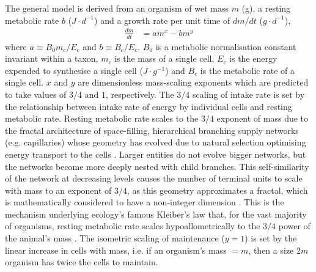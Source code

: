 \documentclass[a4paper]{article} %
\begin{document}
The \cite{West2001} general model is derived from an organism of wet mass $m$ (g), a resting metabolic rate $b$ ($J \cdot d^{-1}$) and a growth rate per unit time of $dm/dt$ ($g \cdot d^{-1}$),
\begin{align}
    \frac{dm}{dt} &= am^x - bm^y \label{west_ogm}
\end{align}
where $a \equiv B_{0}m_{c}/E_{c}$ and $b \equiv B_{c}/E_{c}$. $B_0$ is a metabolic normalisation constant invariant within a taxon, $m_{c}$ is the mass of a single cell, $E_{c}$ is the energy expended to synthesise a single cell ($J \cdot g^{-1}$) and $B_{c}$ is the metabolic rate of a single cell. $x$ and $y$ are dimensionless mass-scaling exponents which are predicted to take values of $3/4$ and $1$, respectively. The $3/4$ scaling of intake rate is set by the relationship between intake rate of energy by individual cells and resting metabolic rate. Resting metabolic rate scales to the $3/4$ exponent of mass due to the fractal architecture of space-filling, hierarchical branching supply networks (e.g. capillaries) whose geometry has evolved due to natural selection optimising energy transport to the cells \autocite{West1997, West2005}. Larger entities do not evolve bigger networks, but the networks become more deeply nested with child branches. This self-similarity of the network at decreasing levels causes the number of terminal units to scale with mass to an exponent of $3/4$, as this geometry approximates a fractal, which is mathematically considered to have a non-integer dimension \autocite{Hausdorff1918, Mandelbrot1982}. This is the mechanism underlying ecology's famous Kleiber's law that, for the vast majority of organisms, resting metabolic rate scales hypoallometrically to the $3/4$ power of the animal's mass \autocite{Kleiber1947, peters1983, niklas1994plant}. The isometric scaling of maintenance ($y = 1$) is set by the linear increase in cells with mass, i.e. if an organism's mass $= m$, then a size $2m$ organism has twice the cells to maintain.
\end{document}
